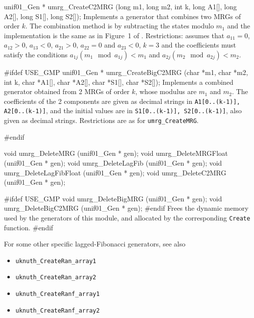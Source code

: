 
\code

unif01_Gen * umrg_CreateC2MRG (long m1, long m2, int k, long A1[],
                               long A2[], long S1[], long S2[]);
\endcode
 \tab  Implements a generator that combines two MRGs of order $k$.
   The combination method is by subtracting the states modulo $m_1$
   and the implementation is the same as in Figure~1 of \cite{rLEC96b}.
   Restrictions: assumes that $a_{11} = 0$, $a_{12} > 0$, $a_{13} < 0$, 
   $a_{21} > 0$, $a_{22} = 0$ and $a_{23} < 0$, 
   $k=3$ and the coefficients must satisfy the conditions
   $a_{1j} (m_1 \mod a_{1j}) < m_1$ and  $a_{2j} (m_2 \mod a_{2j}) < m_2$.
 \endtab
\code


#ifdef USE_GMP
   unif01_Gen * umrg_CreateBigC2MRG (char *m1, char *m2, int k, char *A1[],
                                     char *A2[], char *S1[], char *S2[]);
\endcode
 \tab  Implements a combined generator  obtained from 2 MRGs
   of order $k$, whose modulus are $m_1$ and $m_2$.
   The coefficients of the 2 components are given as decimal strings in
   {\tt  A1[0..(k-1)], A2[0..(k-1)]}, and the initial values
    are in  {\tt S1[0..(k-1)], S2[0..(k-1)]}, also given as decimal strings.
   Restrictions are as for {\tt umrg\_CreateMRG}.
  
 \endtab
\code
#endif
\endcode




\code

void umrg_DeleteMRG    (unif01_Gen * gen);
void umrg_DeleteMRGFloat (unif01_Gen * gen);
void umrg_DeleteLagFib (unif01_Gen * gen);
void umrg_DeleteLagFibFloat (unif01_Gen * gen);
void umrg_DeleteC2MRG  (unif01_Gen * gen);

#ifdef USE_GMP
   void umrg_DeleteBigMRG (unif01_Gen * gen);
   void umrg_DeleteBigC2MRG (unif01_Gen * gen);
#endif
\endcode
  \tab Frees the dynamic memory used by the generators of this module,
  and allocated by the corresponding {\tt Create} function.
 \endtab
\code
\hide
#endif
\endhide
\endcode

{
\iffalse  %
For other specific MRGs, see also

\begin{itemize}
\item {\tt uwu\_CreateMRGWuG2}   %
\end{itemize}

\bigskip
\fi  %

For some other specific lagged-Fibonacci generators, see also

\begin{itemize}
\item {\tt uknuth\_CreateRan\_array1}
\item {\tt uknuth\_CreateRan\_array2}
\item {\tt uknuth\_CreateRanf\_array1}
\item {\tt uknuth\_CreateRanf\_array2}
\end{itemize}
}

